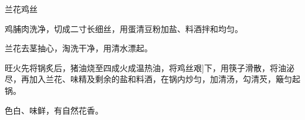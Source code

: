 \begin{recipe}{兰花鸡丝}

\ingredients


\cooking

\step 鸡脯肉洗净，切成二寸长细丝，用蛋清豆粉加盐、料酒拌和均匀。

\step 兰花去茎抽心，淘洗干净，用清水漂起。

\step 旺火先将锅炙后，猪油烧至四成火成温热油，将鸡丝艰]下，用筷子滑散，将油泌尽，再加入兰花、味精及剩余的盐和料酒，在锅内炒匀，加清汤，勾清芡，簸匀起锅。

\notes

色白、味鲜，有自然花香。

\end{recipe}

